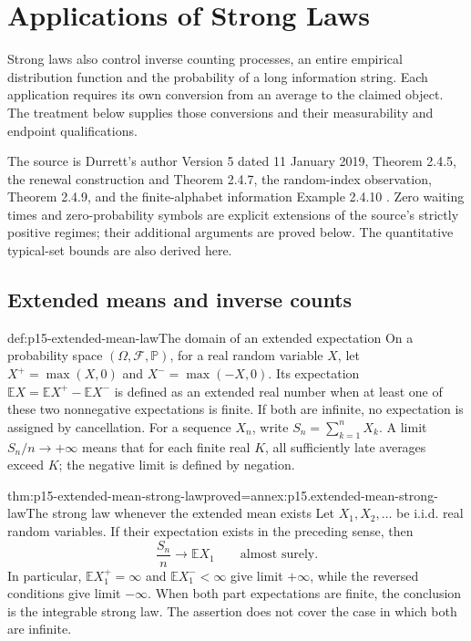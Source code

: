 \chapter{Applications of Strong Laws}
\label{sec:p15-strong-law-applications-chapter}

Strong laws also control inverse counting processes, an entire empirical
distribution function and the probability of a long information string.
Each application requires its own conversion from an average to the
claimed object. The treatment below supplies those conversions and their
measurability and endpoint qualifications.

The source is Durrett's author Version 5 dated 11 January 2019,
Theorem 2.4.5, the renewal construction and Theorem 2.4.7, the
random-index observation, Theorem 2.4.9, and the finite-alphabet
information Example 2.4.10 \cite[pp.~78--80]{DurrettPTEAuthor2019}.
Zero waiting times and zero-probability symbols are explicit extensions
of the source's strictly positive regimes; their additional arguments
are proved below. The quantitative typical-set bounds are also derived
here.

\section{Extended means and inverse counts}
\label{sec:p15-extended-means-renewal}

\begin{hbdefinition}{def:p15-extended-mean-law}{The domain of an extended expectation}
On a probability space \((\Omega,\mathcal F,\mathbb P)\), for a
real random variable \(X\), let
\(X^+=\max(X,0)\) and \(X^-=\max(-X,0)\). Its expectation
\(\mathbb EX=\mathbb EX^+-\mathbb EX^-\) is defined as an extended
real number when at least one of these two nonnegative expectations is
finite. If both are infinite, no expectation is assigned by cancellation.
For a sequence \(X_n\), write \(S_n=\sum_{k=1}^nX_k\). A limit
\(S_n/n\to+\infty\) means that for each finite real \(K\), all
sufficiently late averages exceed \(K\); the negative limit is defined
by negation.
\end{hbdefinition}

\begin{hbtheorem}{thm:p15-extended-mean-strong-law}{proved=annex:p15.extended-mean-strong-law}{The strong law whenever the extended mean exists}
Let \(X_1,X_2,\ldots\) be i.i.d. real random variables.
If their expectation exists in the preceding sense, then
\[
 \frac{S_n}{n}\longrightarrow\mathbb EX_1
                                  \qquad\text{almost surely}.
\]
In particular, \(\mathbb EX_1^+=\infty\) and
\(\mathbb EX_1^-<\infty\) give limit \(+\infty\), while the reversed
conditions give limit \(-\infty\). When both part expectations are
finite, the conclusion is the integrable strong law. The assertion
does not cover the case in which both are infinite.
\end{hbtheorem}

